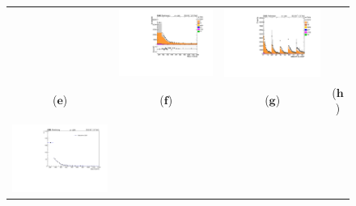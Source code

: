 \begin{figure}[htp]
\begin{tabular}{cccc}
& \hspace{-1.0cm} \includegraphics[scale=0.22]{fig/chapt6/qcd/qcd_e_ch/Mass_H_binned_all.pdf}
& \hspace{-1.0cm} \includegraphics[scale=0.225]{fig/chapt6/qcd/qcd_e_ch/massH_cos_theta_all.pdf}\\
($\mathbf{e}$)\qquad\qquad&($\mathbf{f}$)\qquad\qquad&($\mathbf{g}$)\qquad\qquad&($\mathbf{h}$)\qquad\qquad\\
\\
\hspace{-0.5cm}
\includegraphics[scale=0.22]{fig/chapt6/qcd/qcd_mu_ch/ttbar_m_data_drivenQCD.pdf}

\end{tabular}
\end{figure}
